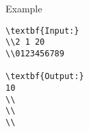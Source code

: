 Example
\begin{verbatim}
\textbf{Input:}
\\2 1 20
\\0123456789

\textbf{Output:}
10
\\
\\
\\\end{verbatim}